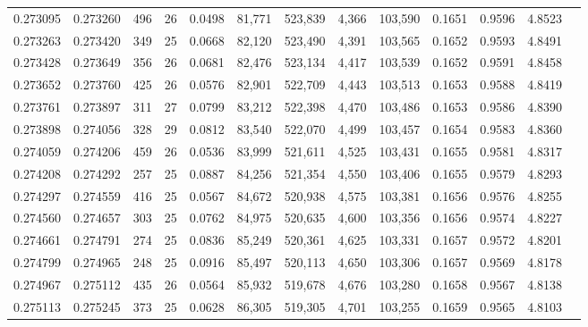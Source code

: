 \begin{tabular}{rrrrrrrrrrrrr}
0.273095 & 0.273260 &   496 &  26 &                                     0.0498 &  81,771 & 523,839 &   4,366 & 103,590 & 0.1651 & 0.9596 & 4.8523 \\
0.273263 & 0.273420 &   349 &  25 &                                     0.0668 &  82,120 & 523,490 &   4,391 & 103,565 & 0.1652 & 0.9593 & 4.8491 \\
0.273428 & 0.273649 &   356 &  26 &                                     0.0681 &  82,476 & 523,134 &   4,417 & 103,539 & 0.1652 & 0.9591 & 4.8458 \\
0.273652 & 0.273760 &   425 &  26 &                                     0.0576 &  82,901 & 522,709 &   4,443 & 103,513 & 0.1653 & 0.9588 & 4.8419 \\
0.273761 & 0.273897 &   311 &  27 &                                     0.0799 &  83,212 & 522,398 &   4,470 & 103,486 & 0.1653 & 0.9586 & 4.8390 \\
0.273898 & 0.274056 &   328 &  29 &                                     0.0812 &  83,540 & 522,070 &   4,499 & 103,457 & 0.1654 & 0.9583 & 4.8360 \\
0.274059 & 0.274206 &   459 &  26 &                                     0.0536 &  83,999 & 521,611 &   4,525 & 103,431 & 0.1655 & 0.9581 & 4.8317 \\
0.274208 & 0.274292 &   257 &  25 &                                     0.0887 &  84,256 & 521,354 &   4,550 & 103,406 & 0.1655 & 0.9579 & 4.8293 \\
0.274297 & 0.274559 &   416 &  25 &                                     0.0567 &  84,672 & 520,938 &   4,575 & 103,381 & 0.1656 & 0.9576 & 4.8255 \\
0.274560 & 0.274657 &   303 &  25 &                                     0.0762 &  84,975 & 520,635 &   4,600 & 103,356 & 0.1656 & 0.9574 & 4.8227 \\
0.274661 & 0.274791 &   274 &  25 &                                     0.0836 &  85,249 & 520,361 &   4,625 & 103,331 & 0.1657 & 0.9572 & 4.8201 \\
0.274799 & 0.274965 &   248 &  25 &                                     0.0916 &  85,497 & 520,113 &   4,650 & 103,306 & 0.1657 & 0.9569 & 4.8178 \\
0.274967 & 0.275112 &   435 &  26 &                                     0.0564 &  85,932 & 519,678 &   4,676 & 103,280 & 0.1658 & 0.9567 & 4.8138 \\
0.275113 & 0.275245 &   373 &  25 &                                     0.0628 &  86,305 & 519,305 &   4,701 & 103,255 & 0.1659 & 0.9565 & 4.8103 \\

\end{tabular}
